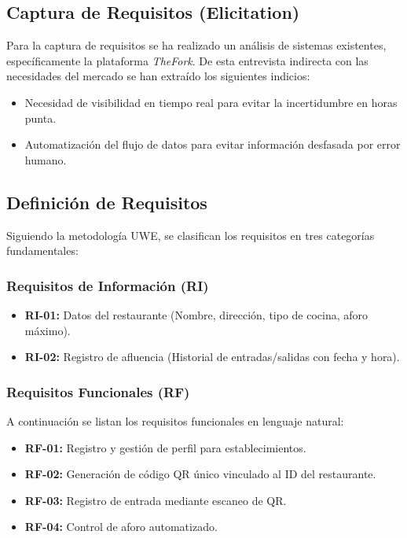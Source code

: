 \subsection{Captura de Requisitos (Elicitation)}
Para la captura de requisitos se ha realizado un análisis de sistemas existentes, específicamente la plataforma \textit{TheFork}. De esta entrevista indirecta con las necesidades del mercado se han extraído los siguientes indicios:
\begin{itemize}
    \item Necesidad de visibilidad en tiempo real para evitar la incertidumbre en horas punta.
    \item Automatización del flujo de datos para evitar información desfasada por error humano.
\end{itemize}

\subsection{Definición de Requisitos}
Siguiendo la metodología UWE, se clasifican los requisitos en tres categorías fundamentales:

\subsubsection{Requisitos de Información (RI)}
\begin{itemize}
    \item \textbf{RI-01:} Datos del restaurante (Nombre, dirección, tipo de cocina, aforo máximo).
    \item \textbf{RI-02:} Registro de afluencia (Historial de entradas/salidas con fecha y hora).
\end{itemize}

\subsubsection{Requisitos Funcionales (RF)}
A continuación se listan los requisitos funcionales en lenguaje natural:
\begin{itemize}
    \item \textbf{RF-01:} Registro y gestión de perfil para establecimientos.
    \item \textbf{RF-02:} Generación de código QR único vinculado al ID del restaurante.
    \item \textbf{RF-03:} Registro de entrada mediante escaneo de QR.
    \item \textbf{RF-04:} Control de aforo automatizado.
\end{itemize}

